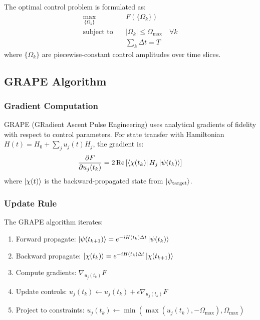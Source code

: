 \documentclass[11pt,a4paper]{article}
\theoremstyle{definition}
\theoremstyle{remark}
\begin{document}
The optimal control problem is formulated as:
\begin{equation}
\begin{aligned}
\max_{\{\Omega_k\}} \quad & F(\{\Omega_k\}) \\
\text{subject to} \quad & |\Omega_k| \leq \Omega_{\text{max}} \quad \forall k \\
& \sum_k \Delta t = T
\end{aligned}
\end{equation}
where $\{\Omega_k\}$ are piecewise-constant control amplitudes over time slices.

\subsection{GRAPE Algorithm}

\subsubsection{Gradient Computation}

GRAPE (GRadient Ascent Pulse Engineering) uses analytical gradients of fidelity with respect to control parameters. For state transfer with Hamiltonian $H(t) = H_0 + \sum_j u_j(t) H_j$, the gradient is:
\begin{equation}
\frac{\partial F}{\partial u_j(t_k)} = 2\Re\left[\bra{\chi(t_k)} H_j \ket{\psi(t_k)}\right]
\end{equation}
where $\ket{\chi(t)}$ is the backward-propagated state from $\ket{\psi_{\text{target}}}$.

\subsubsection{Update Rule}

The GRAPE algorithm iterates:
\begin{enumerate}
    \item Forward propagate: $\ket{\psi(t_{k+1})} = e^{-iH(t_k)\Delta t}\ket{\psi(t_k)}$
    \item Backward propagate: $\ket{\chi(t_k)} = e^{-iH(t_k)\Delta t}\ket{\chi(t_{k+1})}$
    \item Compute gradients: $\nabla_{u_j(t_k)} F$
    \item Update controls: $u_j(t_k) \leftarrow u_j(t_k) + \epsilon \nabla_{u_j(t_k)} F$
    \item Project to constraints: $u_j(t_k) \leftarrow \min(\max(u_j(t_k), -\Omega_{\text{max}}), \Omega_{\text{max}})$
\end{enumerate}
\end{document}
